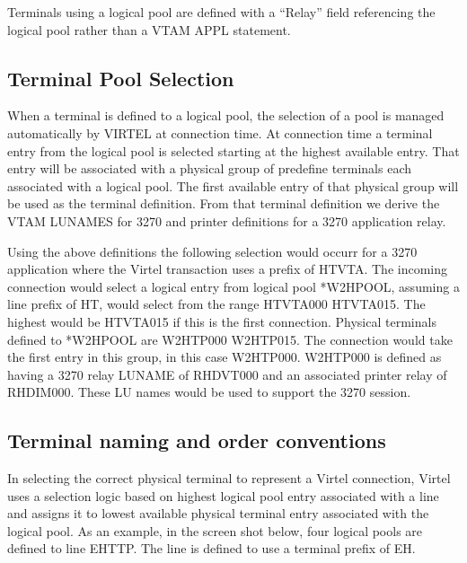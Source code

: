 \documentclass[letterpaper,10pt,english]{sphinxmanual}
\begin{document}
\sphinxAtStartPar
{}

\sphinxAtStartPar
Terminals using a logical pool are defined with a “Relay” field referencing the logical pool rather than a VTAM APPL statement.

\ignorespaces 

\subsection{Terminal Pool Selection}
\label{\detokenize{connectivity_guide:terminal-pool-selection}}\label{\detokenize{connectivity_guide:index-143}}
\sphinxAtStartPar
When a terminal is defined to a logical pool, the selection of a pool is managed automatically by VIRTEL at connection time. At connection time a terminal entry from the logical pool is selected starting at the highest available entry. That entry will be associated with a physical group of predefine terminals each associated with a logical pool. The first available entry of that physical group will be used as the terminal definition. From that terminal definition we derive the VTAM LUNAMES for 3270 and printer definitions for a 3270 application relay.

\sphinxAtStartPar
Using the above definitions the following selection would occurr for a 3270 application where the Virtel transaction uses a prefix of HTVTA. The incoming connection would select a logical entry from logical pool *W2HPOOL, assuming a line prefix of HT, would select from the range HTVTA000 \sphinxhyphen{} HTVTA015. The highest would be HTVTA015 if this is the first connection. Physical terminals defined to *W2HPOOL are W2HTP000 \sphinxhyphen{} W2HTP015. The connection would take the first entry in this group, in this case W2HTP000. W2HTP000 is defined as having a 3270 relay LUNAME of RHDVT000 and an associated printer relay of RHDIM000. These LU names would be used to support the 3270 session.


\subsection{Terminal naming and order conventions}
\label{\detokenize{connectivity_guide:terminal-naming-and-order-conventions}}
\sphinxAtStartPar
In selecting the correct physical terminal to represent a Virtel connection, Virtel uses a selection logic based on highest logical pool entry associated with a line and assigns it to lowest available physical terminal entry associated with the logical pool. As an example, in the screen shot below, four logical pools are defined to line E\sphinxhyphen{}HTTP. The line is defined to use a terminal prefix of EH.
\end{document}
